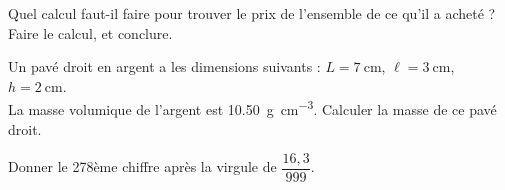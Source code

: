 \documentclass[../Cours.tex]{subfiles}
\begin{document}
\begin{questions}
    \question Quel calcul faut-il faire pour trouver le prix de l'ensemble de ce qu'il a acheté ?
    \question Faire le calcul, et conclure.

        Un pavé droit en argent a les dimensions suivants : $L = \qty{7}{\centi\metre}$, $\ell = \qty{3}{\centi\metre}$, $h = \qty{2}{\centi\metre}$. \\
        La masse volumique de l'argent est \qty{10,50}{\gram\per\centi\metre\cubed}. Calculer la masse de ce pavé droit.

     Donner le 278ème chiffre après la virgule de $\dfrac{16,3}{999}$.
\end{questions}
\end{document}
